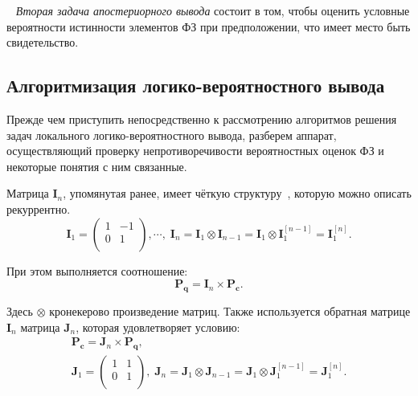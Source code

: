             \begin{Def}
            ~\cite{AVS_2011}
                {\it Вторая задача апостериорного вывода} состоит в том, чтобы оценить условные вероятности истинности элементов ФЗ при предположении, что имеет место быть свидетельство.
            \end{Def}  
  
    
    \subsection{Алгоритмизация логико-вероятностного вывода}
        Прежде чем приступить непосредственно к рассмотрению алгоритмов решения задач локального логико-вероятностного вывода, разберем аппарат, осуществляющий проверку непротиворечивости вероятностных оценок ФЗ и некоторые понятия с ним связанные.
        
       
            
            Матрица $\mathbf{I}_{n}$, упомянутая ранее, имеет чёткую структуру~\cite{AVS_2011}, которую можно описать рекуррентно.
             $$ \mathbf{I}_{1} = \left( \begin{array}{cc}
                 1 & -1 \\
                 0 &  1 \\
                \end{array}  \right) ,\cdots,\; \mathbf{I}_{n} = \mathbf{I}_{1} \otimes \mathbf{I}_{n-1} = \mathbf{I}_{1} \otimes \mathbf{I}_{1}^{[n-1]} = \mathbf{I}_{1}^{[n]}. $$
                
            При этом выполняется соотношение:
            $$ \mathbf{P_{q}} =  \mathbf{I}_{n} \times \mathbf{P_{c}}. $$
            
            Здесь $\otimes$ кронекерово произведение матриц. Также используется обратная матрице $\mathbf{I}_{n}$ матрица $\mathbf{J}_{n}$, которая удовлетворяет условию:
            \begin{eqnarray*}
                \mathbf{P_{c}} =  \mathbf{J}_{n} \times \mathbf{P_{q}}, \\
                \mathbf{J}_{1} = \left( \begin{array}{cc}
                     1 & 1 \\
                     0 & 1 \\
                \end{array}  \right),\; \mathbf{J}_{n} = \mathbf{J}_{1} \otimes \mathbf{J}_{n-1} = \mathbf{J}_{1} \otimes \mathbf{J}_{1}^{[n-1]} = \mathbf{J}_{1}^{[n]}.
            \end{eqnarray*}
            
